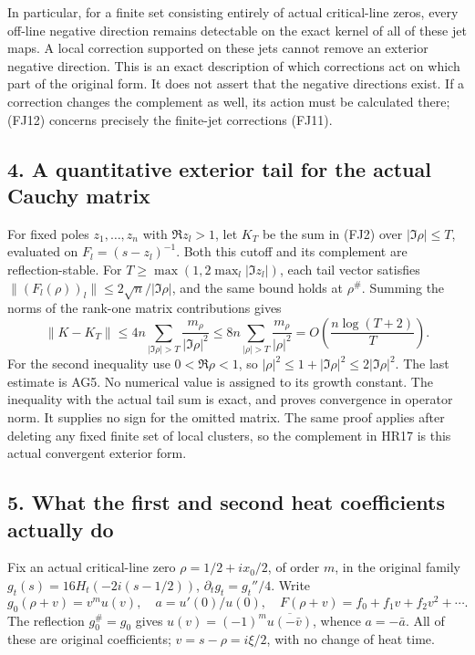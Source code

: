 \documentclass[
  10pt,
  a4paper,
]{article}
\begin{document}
In particular, for a finite set consisting entirely of actual
critical-line zeros, every off-line negative direction remains
detectable on the exact kernel of all of these jet maps. A local
correction supported on these jets cannot remove an exterior negative
direction. This is an exact description of which corrections act on
which part of the original form. It does not assert that the negative
directions exist. If a correction changes the complement as well, its
action must be calculated there; (FJ12) concerns precisely the
finite-jet corrections (FJ11).

\subsection{4. A quantitative exterior tail for the actual Cauchy
matrix}\label{a-quantitative-exterior-tail-for-the-actual-cauchy-matrix}

For fixed poles \(z_1,\ldots,z_n\) with \(\Re z_l>1\), let \(K_T\) be
the sum in (FJ2) over \(|\Im\rho|\le T\), evaluated on
\(F_l=(s-z_l)^{-1}\). Both this cutoff and its complement are
reflection-stable. For \(T\ge\max(1,2\max_l|\Im z_l|)\), each tail
vector satisfies \(\|(F_l(\rho))_l\|\le2\sqrt n/|\Im\rho|\), and the
same bound holds at \(\rho^\#\). Summing the norms of the rank-one
matrix contributions gives \[
\|K-K_T\|\le4n\sum_{|\Im\rho|>T}\frac{m_\rho}{|\Im\rho|^2}
 \le8n\sum_{|\rho|>T}\frac{m_\rho}{|\rho|^2}
 =O\left(\frac{n\log(T+2)}T\right).
\tag{FJ14}
\] For the second inequality use \(0<\Re\rho<1\), so
\(|\rho|^2\le1+|\Im\rho|^2\le2|\Im\rho|^2\). The last estimate is AG5.
No numerical value is assigned to its growth constant. The inequality
with the actual tail sum is exact, and proves convergence in operator
norm. It supplies no sign for the omitted matrix. The same proof applies
after deleting any fixed finite set of local clusters, so the complement
in HR17 is this actual convergent exterior form.

\subsection{5. What the first and second heat coefficients actually
do}\label{what-the-first-and-second-heat-coefficients-actually-do}

Fix an actual critical-line zero \(\rho=1/2+ix_0/2\), of order \(m\), in
the original family \(g_t(s)=16H_t(-2i(s-1/2))\),
\(\partial_tg_t=g_t''/4\). Write \[
g_0(\rho+v)=v^m u(v),\quad a=u'(0)/u(0),\quad
F(\rho+v)=f_0+f_1v+f_2v^2+\cdots.
\tag{FJ15}
\] The reflection \(g_0^\#=g_0\) gives
\(u(v)=(-1)^m\overline{u(-\bar v)}\), whence \(a=-\bar a\). All of these
are original coefficients; \(v=s-\rho=i\xi/2\), with no change of heat
time.
\end{document}
